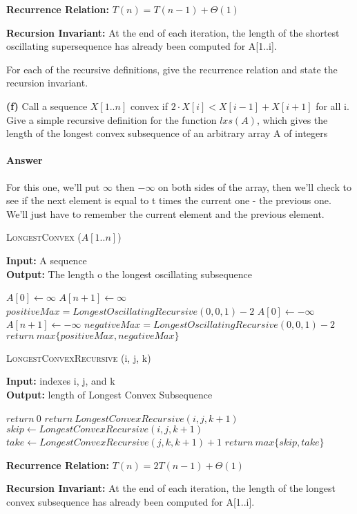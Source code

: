 \documentclass{article}
\begin{document}
{\bf Recurrence Relation: } $T(n) = T(n-1) + \Theta(1)$

{\bf Recursion Invariant:} At the end of each iteration, the length of the shortest oscillating supersequence has already been computed for A[1..i].



For each of the recursive definitions, give the recurrence
relation and state the recursion invariant.

{\bf (f)} Call a sequence $X[1.. n]$ convex if $2 \cdot X[i] < X[i-1] + X[i+1]$ for all i.
Give a simple recursive definition for the function $lxs(A)$, which gives
the length of the longest convex subsequence of an arbitrary array A of
integers

\paragraph{Answer}

For this one, we'll put $\infty$ then $-\infty$ on both sides of the array, then we'll check to see
if the next element is equal to t times the current one - the previous one. We'll just have to
remember the current element and the previous element.

\begin{algorithm} \caption{\textsc{LongestConvex} ($A[1..n]$)}\label{alg:seb}
    {\bf Input:} A sequence\\
    {\bf Output:} The length o the longest oscillating subsequence
    \begin{algorithmic}[1]
        \State$A[0] \gets \infty$
        \State$A[n+1] \gets \infty$
        \State$positiveMax = LongestOscillatingRecursive(0, 0, 1) -2$
        \State$A[0] \gets -\infty$
        \State$A[n+1] \gets -\infty$
        \State$negativeMax = LongestOscillatingRecursive(0, 0, 1) -2$
        \State$return\ max\{positiveMax, negativeMax\}$
    \end{algorithmic}
\end{algorithm}

\begin{algorithm} \caption{\textsc{LongestConvexRecursive} (i, j, k)}\label{alg:seb}
    {\bf Input:} indexes i, j, and k\\
    {\bf Output:} length of Longest Convex Subsequence
    \begin{algorithmic}[1]
            \State$return\ 0$
            \State$return\ LongestConvexRecursive(i, j, k +1)$
        \EndIf{}
        \Else{}
            \State$skip \gets LongestConvexRecursive(i, j, k+1)$
            \State$take \gets LongestConvexRecursive(j, k, k+1) +1$
        \State$return\ max\{skip, take\}$
        \EndIf{}
    \end{algorithmic}
\end{algorithm}

{\bf Recurrence Relation: } $T(n) = 2T(n-1) + \Theta(1)$

{\bf Recursion Invariant:} At the end of each iteration, the length of the longest convex subsequence has already been computed for A[1..i].
\end{document}
